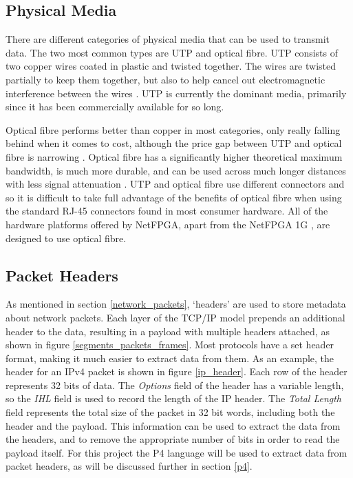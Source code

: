 \subsection{Physical Media}
\label{physical_media_research}
There are different categories of physical media that can be used to transmit data. The two most common types are UTP and optical fibre. UTP consists of two copper wires coated in plastic and twisted together. The wires are twisted partially to keep them together, but also to help cancel out electromagnetic interference between the wires \cite{networks03}. UTP is currently the dominant media, primarily since it has been commercially available for so long.

Optical fibre performs better than copper in most categories, only really falling behind when it comes to cost, although the price gap between UTP and optical fibre is narrowing \cite{copper_fibre_universal}. Optical fibre has a significantly higher theoretical maximum bandwidth, is much more durable, and can be used across much longer distances with less signal attenuation \cite{copper_fibre_multicom}. UTP and optical fibre use different connectors and so it is difficult to take full advantage of the benefits of optical fibre when using the standard RJ-45 connectors found in most consumer hardware. All of the hardware platforms offered by NetFPGA, apart from the NetFPGA 1G \cite{NetFPGA_1G}, are designed to use optical fibre. %


\subsection{Packet Headers}
As mentioned in section \ref{network_packets}, `headers' are used to store metadata about network packets.
Each layer of the TCP/IP model prepends an additional header to the data, resulting in a payload with multiple headers attached, as shown in figure \ref{segments_packets_frames}.
Most protocols have a set header format, making it much easier to extract data from them. As an example, the header for an IPv4 packet is shown in figure \ref{ip_header}. Each row of the header represents 32 bits of data.
The \textit{Options} field of the header has a variable length, so the \textit{IHL} field is used to record the length of the IP header.
The \textit{Total Length} field represents the total size of the packet in 32 bit words, including both the header and the payload.
This information can be used to extract the data from the headers, and to remove the appropriate number of bits in order to read the payload itself. For this project the P4 language \cite{P4} will be used to extract data from packet headers, as will be discussed further in section \ref{p4}.

